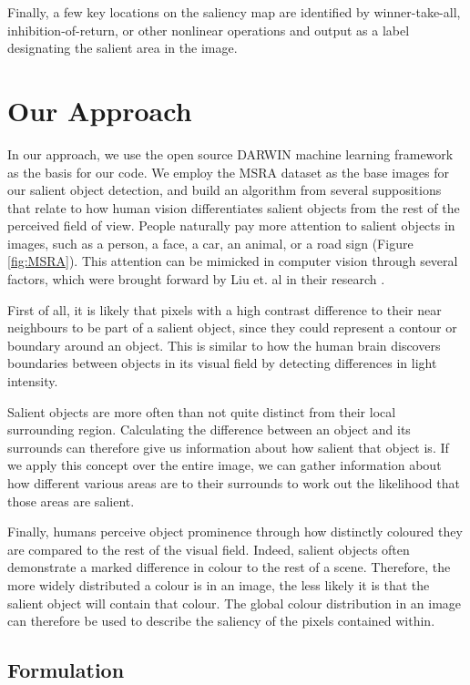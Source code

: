 \documentclass[10pt,twocolumn,letterpaper]{article}
\begin{document}
Finally, a few key locations on the saliency map are identified by winner-take-all, inhibition-of-return, or other nonlinear operations and output as a label designating the salient area in the image.

\section{Our Approach}
In our approach, we use the open source DARWIN machine learning framework \cite{drwn} as the basis for our code. We employ the MSRA dataset as the base images for our salient object detection, and build an algorithm from several suppositions that relate to how human vision differentiates salient objects from the rest of the perceived field of view.  People naturally pay more attention to salient objects in images, such as a person, a face, a car, an animal, or a road sign (Figure \ref{fig:MSRA}). This attention can be mimicked in computer vision through several factors, which were brought forward by Liu et. al in their research \cite{sal2007}\cite{sal2011}.


First of all, it is likely that pixels with a high contrast difference to their near neighbours to be part of a salient object, since they could represent a contour or boundary around an object.  This is similar to how the human brain discovers boundaries between objects in its visual field by detecting differences in light intensity.

Salient objects are more often than not quite distinct from their local surrounding region.  Calculating the difference between an object and its surrounds can therefore give us information about how salient that object is.  If we apply this concept over the entire image, we can gather information about how different various areas are to their surrounds to work out the likelihood that those areas are salient.


Finally, humans perceive object prominence through how distinctly coloured they are compared to the rest of the visual field.  Indeed, salient objects often demonstrate a marked difference in colour to the rest of a scene.  Therefore, the more widely distributed a colour is in an image, the less likely it is that the salient object will contain that colour.  The global colour distribution in an image can therefore be used to describe the saliency of the pixels contained within.


\subsection{Formulation}
\end{document}

